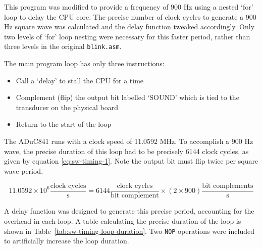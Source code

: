 \documentclass[11pt]{article}
\begin{document}
This program was modified to provide a frequency of 900 Hz using a nested `for' loop to delay the CPU core. The precise number of clock cycles to generate a 900 Hz square wave was calculated and the delay function tweaked accordingly. Only two levels of `for' loop nesting were necessary for this faster period, rather than three levels in the original \texttt{blink.asm}.

The main program loop has only three instructions:\begin{itemize}
    \item Call a `delay' to stall the CPU for a time
    \item Complement (flip) the output bit labelled `SOUND' which is tied to the transducer on the physical board
    \item Return to the start of the loop
\end{itemize}

The ADuC841 runs with a clock speed of 11.0592 MHz. To accomplish a 900 Hz wave, the precise duration of this loop had to be precisely 6144 clock cycles, as given by equation \ref{eq:sw-timing-1}. Note the output bit must flip twice per square wave period.

\begin{equation}
    \label{eq:sw-timing-1}
    11.0592 \times 10^6 \frac{\text{clock cycles}}{\text{s}}=6144 \frac{\text{clock cycles}}{\text{bit complement}}\times (2\times900) \frac{\text{bit complements}}{\text{s}}
\end{equation}

A delay function was designed to generate this precise period, accounting for the overhead in each loop. A table calculating the precise duration of the loop is shown in Table~\ref{tab:sw-timing-loop-duration}. Two \texttt{NOP} operations were included to artificially increase the loop duration.
\end{document}
